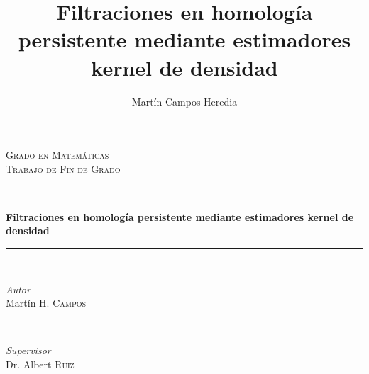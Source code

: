 \documentclass[12pt,a4paper,twoside]{article} %
\theoremstyle{plain}
\theoremstyle{definition}
\begin{document}
\title{Filtraciones en homología persistente mediante estimadores kernel de densidad}
\author{Martín Campos Heredia}
\begin{titlepage}

%
%


	\newcommand{\HRule}{\rule{\linewidth}{0.5mm}} %
	
	\center %
	

	
	\textsc{\large Grado en Matemáticas}\\[0.5cm] %
	
	\textsc{Trabajo de Fin de Grado}\\[0.5cm] %
	
	
	\HRule\\[0.4cm]
	
	{\Large\bfseries Filtraciones en homología persistente mediante estimadores kernel de densidad}\\[0.4cm] %

	\HRule\\[1.5cm]
	
	
	\begin{minipage}{0.4\textwidth}
		\begin{flushleft}
			\large
			\textit{Autor}\\
			Martín H. \textsc{Campos} %
		\end{flushleft}
	\end{minipage}
	~
	\begin{minipage}{0.4\textwidth}
		\begin{flushright}
			\large
			\textit{Supervisor}\\
			Dr. Albert \textsc{Ruiz} %
		\end{flushright}
	\end{minipage}
	


\end{titlepage}
\end{document}

